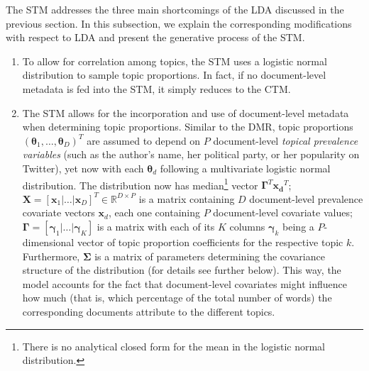 The STM addresses the three main shortcomings of the LDA discussed in the previous section. In this subsection, we explain the corresponding modifications with respect to LDA and present the generative process of the STM.

\begin{enumerate}[label=(\roman*)]
\item To allow for correlation among topics, the STM uses a logistic normal distribution to sample topic proportions. In fact, if no document-level metadata is fed into the STM, it simply reduces to the CTM.
\item The STM allows for the incorporation and use of document-level metadata when determining topic proportions. Similar to the DMR, topic proportions $(\boldsymbol{\theta}_1,\dots,\boldsymbol{\theta}_D)^T$ are assumed to depend on $P$ document-level \textit{topical prevalence variables} (such as the author's name, her political party, or her popularity on Twitter), yet now with each $\boldsymbol{\theta}_d$ following a multivariate logistic normal distribution. The distribution now has median\footnote{There is no analytical closed form for the mean in the logistic normal distribution.} vector $\boldsymbol{\Gamma}^T\boldsymbol{x_d}^T$; $\boldsymbol{X}=[\boldsymbol{x}_1|\dots|\boldsymbol{x}_D]^T \in \mathbb{R}^{D \times P}$ is a matrix containing $D$ document-level prevalence covariate vectors $\boldsymbol{x}_d$, each one containing $P$ document-level covariate values; $\boldsymbol{\Gamma} = [\boldsymbol{\gamma}_1|\dots|\boldsymbol{\gamma}_K]$ is a matrix with each of its $K$ columns $\boldsymbol{\gamma}_k$ being a $P$-dimensional vector of topic proportion coefficients for the respective topic $k$. Furthermore, $\boldsymbol{\Sigma}$ is a matrix of parameters determining the covariance structure of the distribution (for details see further below). This way, the model accounts for the fact that document-level covariates might influence how much (that is, which percentage of the total number of words) the corresponding documents attribute to the different topics.

\end{enumerate}
